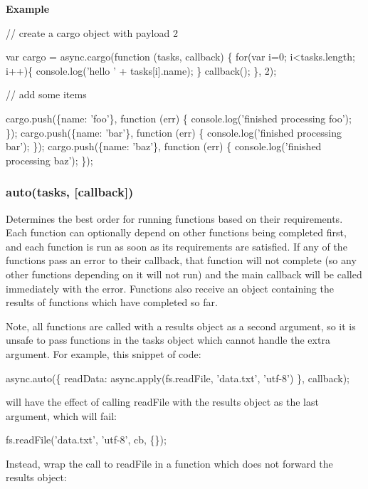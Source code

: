 {\bfseries Example}


\begin{DoxyCode}
// create a cargo object with payload 2

var cargo = async.cargo(function (tasks, callback) \{
    for(var i=0; i<tasks.length; i++)\{
      console.log('hello ' + tasks[i].name);
    \}
    callback();
\}, 2);


// add some items

cargo.push(\{name: 'foo'\}, function (err) \{
    console.log('finished processing foo');
\});
cargo.push(\{name: 'bar'\}, function (err) \{
    console.log('finished processing bar');
\});
cargo.push(\{name: 'baz'\}, function (err) \{
    console.log('finished processing baz');
\});
\end{DoxyCode}
 



\label{_auto}%
 \subsubsection*{auto(tasks, \mbox{[}callback\mbox{]})}

Determines the best order for running functions based on their requirements. Each function can optionally depend on other functions being completed first, and each function is run as soon as its requirements are satisfied. If any of the functions pass an error to their callback, that function will not complete (so any other functions depending on it will not run) and the main callback will be called immediately with the error. Functions also receive an object containing the results of functions which have completed so far.

Note, all functions are called with a results object as a second argument, so it is unsafe to pass functions in the tasks object which cannot handle the extra argument. For example, this snippet of code\+:


\begin{DoxyCode}
async.auto(\{
  readData: async.apply(fs.readFile, 'data.txt', 'utf-8')
\}, callback);
\end{DoxyCode}


will have the effect of calling read\+File with the results object as the last argument, which will fail\+:


\begin{DoxyCode}
fs.readFile('data.txt', 'utf-8', cb, \{\});
\end{DoxyCode}


Instead, wrap the call to read\+File in a function which does not forward the results object\+:


